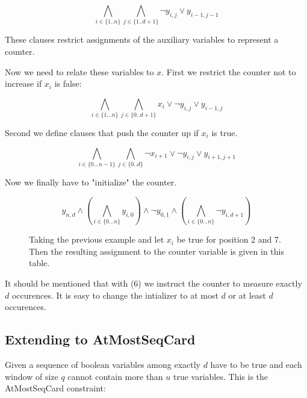 \documentclass[]{llncs}
\newcommand{\AtMostSeqCard}{AtMostSeqCard }
\begin{document}
\begin{equation}
    \bigwedge_{i \in \{1..n\}} \bigwedge_{j\in \{1..d+1\}}
    \neg y_{i,j} \vee y_{i-1,j-1}
\end{equation}

These clauses restrict assignments of the auxiliary variables to 
represent a counter.

Now we need to relate these variables to $x$.  First we restrict the
counter not to increase if $x_{i}$ is false:

\begin{equation}
    \bigwedge_{i \in \{1\ldots n\}} \bigwedge_{j\in\{0..d+1\}}
    x_{i} \vee \neg y_{i,j} \vee y_{i-1,j}
\end{equation}

Second we define clauses that push  the counter up if $x_i$ is true. 

\begin{equation}
    \bigwedge_{i \in \{0\ldots n-1\}} \bigwedge_{j\in\{0..d\}}
    \neg x_{i+1} \vee \neg y_{i,j} \vee y_{i+1,j+1}
\end{equation}

Now we finally have to "initialize" the counter. 

\begin{equation}
y_{n,d} \wedge \left (\bigwedge_{i\in\{0\ldots n\}} y_{i,0} \right )\wedge \neg
    y_{0,1} \wedge \left(\bigwedge_{i\in\{0\ldots n\}} \neg
        y_{i,d+1}\right )
\end{equation}


\begin{figure}
\centering 
\caption{Taking the previous example and let $x_{i}$ be true for
    position 2 and 7. Then the resulting assignment to the counter
    variable is given in this table. }

\end{figure}

It should be mentioned that with (6) we instruct the counter to measure
exactly $d$ occurences. It is easy to change the intializer to at most
$d$ or at least $d$ occurences. 

\subsection{Extending to \AtMostSeqCard}

Given a sequence of boolean variables among exactly $d$ have to be true
and each window of size $q$ cannot contain more than $u$ true variables.
This is the \AtMostSeqCard constraint: 
\end{document}
